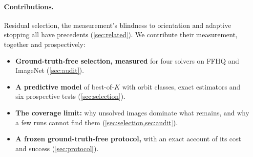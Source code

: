 \paragraph{Contributions.}
Residual selection, the measurement's blindness to orientation and adaptive stopping all have precedents (\cref{sec:related}).
We contribute their measurement, together and prospectively:
\begin{itemize}[leftmargin=*,itemsep=1pt,topsep=2pt]
\item \textbf{Ground-truth-free selection, measured} for four solvers on FFHQ and ImageNet (\cref{sec:audit}).
\item \textbf{A predictive model} of best-of-$K$ with orbit classes, exact estimators and six prospective tests (\cref{sec:selection}).
\item \textbf{The coverage limit:} why unsolved images dominate what remains, and why a few runs cannot find them (\cref{sec:selection,sec:audit}).
\item \textbf{A frozen ground-truth-free protocol,} with an exact account of its cost and success (\cref{sec:protocol}).
\end{itemize}
